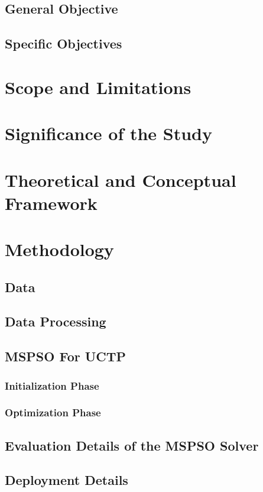 \documentclass[sigconf]{acmart}
\begin{document}
    \subsection{General Objective}
    \subsection{Specific Objectives}

\section{Scope and Limitations}

\section{Significance of the Study}

\section{Theoretical and Conceptual Framework}


\section{Methodology}
    \subsection{Data}
    \subsection{Data Processing}
    \subsection{MSPSO For UCTP}
        \subsubsection{Initialization Phase}
        \subsubsection{Optimization Phase}
    \subsection{Evaluation Details of the MSPSO Solver}
    \subsection{Deployment Details}
\end{document}
